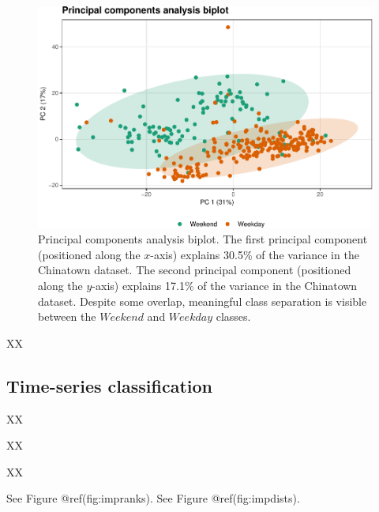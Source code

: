 \documentclass{article}
\begin{document}
\begin{figure}
\centering
\includegraphics{olet5610_report_files/figure-latex/biplot-1.pdf}
\caption{Principal components analysis biplot. The first principal
component (positioned along the \(x\)-axis) explains 30.5\% of the
variance in the Chinatown dataset. The second principal component
(positioned along the \(y\)-axis) explains 17.1\% of the variance in the
Chinatown dataset. Despite some overlap, meaningful class separation is
visible between the \(Weekend\) and \(Weekday\) classes.}
\end{figure}

XX

\hypertarget{time-series-classification}{%
\subsection{Time-series
classification}\label{time-series-classification}}

XX

XX

XX

See Figure @ref(fig:impranks). See Figure @ref(fig:impdists).
\end{document}
